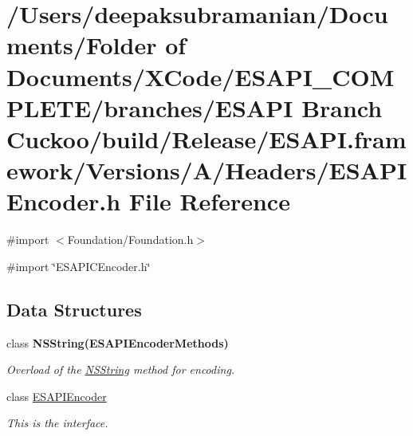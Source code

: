\hypertarget{a00012}{
\section{/Users/deepaksubramanian/Documents/Folder of Documents/XCode/ESAPI\_\-COMPLETE/branches/ESAPI Branch Cuckoo/build/Release/ESAPI.framework/Versions/A/Headers/ESAPIEncoder.h File Reference}
\label{df/d86/a00012}
}
{\ttfamily \#import $<$Foundation/Foundation.h$>$}\par
{\ttfamily \#import \char`\"{}ESAPICEncoder.h\char`\"{}}\par
\subsection*{Data Structures}
\begin{DoxyCompactItemize}
\item 
class {\bfseries NSString(ESAPIEncoderMethods)}
\begin{DoxyCompactList}\small\item\em Overload of the \hyperlink{a00003}{NSString} method for encoding. \end{DoxyCompactList}\item 
class \hyperlink{a00001}{ESAPIEncoder}
\begin{DoxyCompactList}\small\item\em This is the interface. \end{DoxyCompactList}\end{DoxyCompactItemize}
